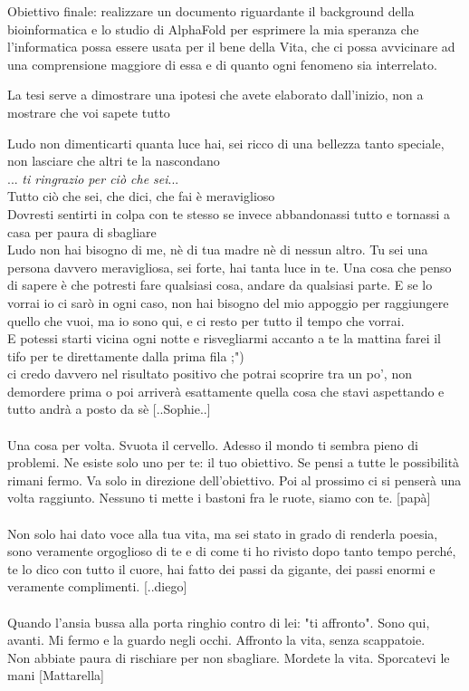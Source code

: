 Obiettivo finale: realizzare un documento riguardante il background della bioinformatica e lo studio di AlphaFold per esprimere la mia speranza che l’informatica possa essere usata per il bene della Vita, che ci possa avvicinare ad una comprensione maggiore di essa e di quanto ogni fenomeno sia interrelato.\newline

La tesi serve a dimostrare una ipotesi che avete elaborato dall’inizio, non a mostrare che voi sapete tutto

Ludo non dimenticarti quanta luce hai, sei ricco di una bellezza tanto speciale, non lasciare che altri te la nascondano\\
... \textit{ti ringrazio per ciò che sei}...\\
Tutto ciò che sei, che dici, che fai è meraviglioso\\
Dovresti sentirti in colpa con te stesso se invece abbandonassi tutto e tornassi a casa per paura di sbagliare\\
Ludo non hai bisogno di me, nè di tua madre nè di nessun altro. Tu sei una persona davvero meravigliosa, sei forte, hai tanta luce in te. Una cosa che penso di sapere è che potresti fare qualsiasi cosa, andare da qualsiasi parte. E se lo vorrai io ci sarò in ogni caso, non hai bisogno del mio appoggio per raggiungere quello che vuoi, ma io sono qui, e ci resto per tutto il tempo che vorrai.\\
E potessi starti vicina ogni notte e risvegliarmi accanto a te la mattina farei il tifo per te direttamente dalla prima fila ;")\\
ci credo davvero nel risultato positivo che potrai scoprire tra un po', non demordere prima o poi arriverà esattamente quella cosa che stavi aspettando e tutto andrà a posto da sè [..Sophie..]\\ \\

Una cosa per volta. Svuota il cervello. Adesso il mondo ti sembra pieno di problemi. Ne esiste solo uno per te: il tuo obiettivo. Se pensi a tutte le possibilità rimani fermo. Va solo in direzione dell'obiettivo. Poi al prossimo ci si penserà una volta raggiunto. Nessuno ti mette i bastoni fra le ruote, siamo con te. [papà] \\ \\


Non solo hai dato voce alla tua vita, ma sei stato in grado di renderla poesia, sono veramente orgoglioso di te e di come ti ho rivisto dopo tanto tempo perché, te lo dico con tutto il cuore, hai fatto dei passi da gigante, dei passi enormi e veramente complimenti. [..diego] \\ \\
Quando l'ansia bussa alla porta ringhio contro di lei: "ti affronto". Sono qui, avanti. Mi fermo e la guardo negli occhi. Affronto la vita, senza scappatoie. \\

Non abbiate paura di rischiare per non sbagliare. Mordete la vita. Sporcatevi le mani [Mattarella] \\
\clearpage